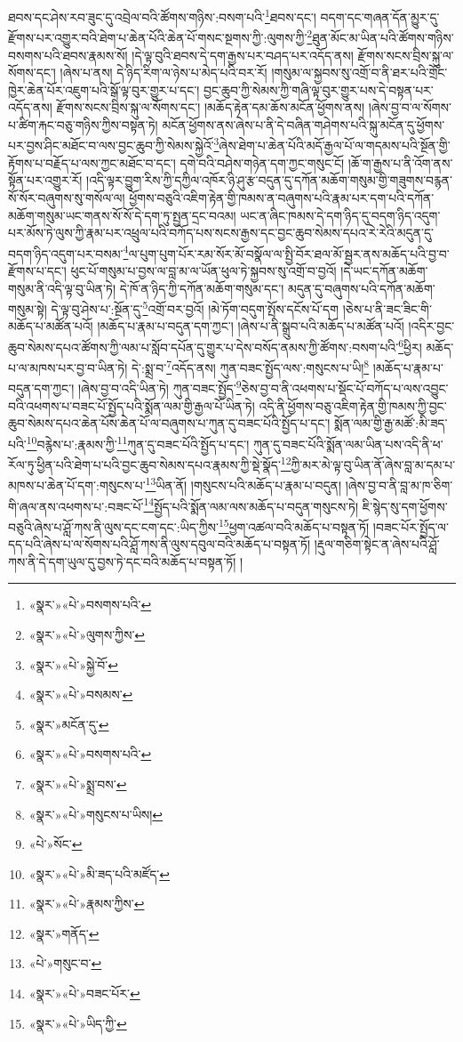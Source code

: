 ཐབས་དང་ཤེས་རབ་ཟུང་དུ་འབྲེལ་བའི་ཚོགས་གཉིས་:བསག་པའི་\footnote{«སྣར་»«པེ་»བསགས་པའི་}ཐབས་དང་། བདག་དང་གཞན་དོན་མྱུར་དུ་རྫོགས་པར་འགྱུར་བའི་ཐེག་པ་ཆེན་པོའི་ཆེན་པོ་གསང་སྔགས་ཀྱི་:ལུགས་ཀྱི་\footnote{«སྣར་»«པེ་»ལུགས་ཀྱིས་}ཐུན་མོང་མ་ཡིན་པའི་ཚོགས་གཉིས་བསགས་པའི་ཐབས་རྣམས་སོ། །དེ་ལྟ་བུའི་ཐབས་དེ་དག་རྒྱས་པར་བཤད་པར་འདོད་ནས། རྫོགས་སངས་བྲིས་སྐུ་ལ་སོགས་དང་། །ཞེས་པ་ནས། དེ་ཉིད་རིག་ལ་ཉེས་པ་མེད་པའི་བར་རོ། །གསུམ་ལ་སྐྱབས་སུ་འགྲོ་བ་ནི་ཐར་པའི་གྲོང་ཁྱེར་ཆེན་པོར་འཇུག་པའི་སྒོ་ལྟ་བུར་གྱུར་པ་དང་། བྱང་ཆུབ་ཀྱི་སེམས་ཀྱི་གཞི་ལྟ་བུར་གྱུར་པས་དེ་བསྟན་པར་འདོད་ནས། རྫོགས་སངས་བྲིས་སྐུ་ལ་སོགས་དང་། །མཆོད་རྟེན་དམ་ཆོས་མངོན་ཕྱོགས་ནས། །ཞེས་བྱ་བ་ལ་སོགས་པ་ཚིག་རྐང་བཅུ་གཉིས་ཀྱིས་བསྟན་ཏེ། མངོན་ཕྱོགས་ནས་ཞེས་པ་ནི་དེ་བཞིན་གཤེགས་པའི་སྐུ་མངོན་དུ་ཕྱོགས་པར་བྱས་ཤིང་མཐོང་བ་ལས་བྱང་ཆུབ་ཀྱི་སེམས་སྐྱེའོ་\footnote{«སྣར་»«པེ་»སྐྱེ་བོ་}ཞེས་ཐེག་པ་ཆེན་པོའི་མདོ་རྒྱལ་པོ་ལ་གདམས་པའི་སྔོན་གྱི་རྟོགས་པ་བརྗོད་པ་ལས་ཀྱང་མཐོང་བ་དང་། དགེ་བའི་བཤེས་གཉེན་དག་ཀྱང་གསུང་ངོ། །ཆོ་ག་རྒྱས་པ་ནི་འོག་ནས་སྟོན་པར་འགྱུར་རོ། །འདི་ལྟར་བྱུག་རིས་ཀྱི་དཀྱིལ་འཁོར་ཉི་ཤུ་རྩ་བདུན་དུ་དཀོན་མཆོག་གསུམ་གྱི་གཟུགས་བརྙན་སོ་སོར་བཞུགས་སུ་གསོལ་ལ། ཕྱོགས་བཅུའི་འཇིག་རྟེན་གྱི་ཁམས་ན་བཞུགས་པའི་རྣམ་པར་དག་པའི་དཀོན་མཆོག་གསུམ་ཡང་གནས་སོ་སོ་དེ་དག་ཏུ་སྤྱན་དྲང་བའམ། ཡང་ན་ཞིང་ཁམས་དེ་དག་ཉིད་དུ་བདག་ཉིད་འདུག་པར་མོས་ཏེ་ལུས་ཀྱི་རྣམ་པར་འཕྲུལ་པའི་བཀོད་པས་སངས་རྒྱས་དང་བྱང་ཆུབ་སེམས་དཔའ་རེ་རེའི་མདུན་དུ་བདག་ཉིད་འདུག་པར་བསམ་\footnote{«སྣར་»«པེ་»བསམས་}ལ་པུག་པུག་པོར་རམ་སོར་མོ་བསྣོལ་ལ་སྤྱི་བོར་ཐལ་མོ་སྦྱར་ནས་མཆོད་པའི་བྱ་བ་རྫོགས་པ་དང་། ཕུང་པོ་གསུམ་པ་བྱས་ལ་བླ་མ་ལ་ཡོན་ཕུལ་ཏེ་སྐྱབས་སུ་འགྲོ་བ་བྱའོ། །དེ་ཡང་དཀོན་མཆོག་གསུམ་ནི་འདི་ལྟ་བུ་ཡིན་ཏེ། དེ་ཁོ་ན་ཉིད་ཀྱི་དཀོན་མཆོག་གསུམ་དང་། མདུན་དུ་བཞུགས་པའི་དཀོན་མཆོག་གསུམ་སྟེ། དེ་ལྟ་བུ་ཤེས་པ་:སྔོན་དུ་\footnote{«སྣར་»མངོན་དུ་}འགྲོ་བར་བྱའོ། །མེ་ཏོག་བདུག་སྤོས་དངོས་པོ་དག །ཅེས་པ་ནི་ཟང་ཟིང་གི་མཆོད་པ་མཚོན་པའོ། །མཆོད་པ་རྣམ་པ་བདུན་དག་ཀྱང་། །ཞེས་པ་ནི་སྒྲུབ་པའི་མཆོད་པ་མཚོན་པའོ། །འདིར་བྱང་ཆུབ་སེམས་དཔའ་ཚོགས་ཀྱི་ལམ་པ་སློབ་དཔོན་དུ་གྱུར་པ་དེས་བསོད་ནམས་ཀྱི་ཚོགས་:བསག་པའི་\footnote{«སྣར་»«པེ་»བསགས་པའི་}ཕྱིར། མཆོད་པ་ལ་མཁས་པར་བྱ་བ་ཡིན་ཏེ། དེ་:སྨྲ་བ་\footnote{«སྣར་»«པེ་»སྨྲ་བས་}འདོད་ནས། ཀུན་བཟང་སྤྱོད་ལས་:གསུངས་པ་ཡི།\footnote{«སྣར་»«པེ་»གསུངས་པ་ཡིས།} །མཆོད་པ་རྣམ་པ་བདུན་དག་ཀྱང་། །ཞེས་བྱ་བ་འདི་ཡིན་ཏེ། ཀུན་བཟང་སྤྱོད་\footnote{«པེ་»སོང་}ཅེས་བྱ་བ་ནི་འཕགས་པ་སྡོང་པོ་བཀོད་པ་ལས་འབྱུང་བའི་འཕགས་པ་བཟང་པོ་སྤྱོད་པའི་སྨོན་ལམ་གྱི་རྒྱལ་པོ་ཡིན་ཏེ། འདི་ནི་ཕྱོགས་བཅུ་འཇིག་རྟེན་གྱི་ཁམས་ཀྱི་བྱང་ཆུབ་སེམས་དཔའ་ཆེན་པོས་ཆེན་པོ་ལ་བཞུགས་པ་ཀུན་དུ་བཟང་པོའི་སྤྱོད་པ་དང་། སྨོན་ལམ་གྱི་རྒྱ་མཚོ་:མི་ཟད་པའི་\footnote{«སྣར་»«པེ་»མི་ཟད་པའི་མཛོད་}བརྙེས་པ་:རྣམས་ཀྱི་\footnote{«སྣར་»«པེ་»རྣམས་ཀྱིས་}ཀུན་དུ་བཟང་པོའི་སྤྱོད་པ་དང་། ཀུན་དུ་བཟང་པོའི་སྨོན་ལམ་ཡིན་པས་འདི་ནི་ཕ་རོལ་ཏུ་ཕྱིན་པའི་ཐེག་པ་པའི་བྱང་ཆུབ་སེམས་དཔའ་རྣམས་ཀྱི་སྡེ་སྣོད་\footnote{«སྣར་»གནོད་}ཀྱི་མར་མེ་ལྟ་བུ་ཡིན་ནོ་ཞེས་བླ་མ་དམ་པ་མཁས་པ་ཆེན་པོ་དག་:གསུངས་པ་\footnote{«པེ་»གསུང་བ་}ཡིན་ནོ། །གསུངས་པའི་མཆོད་པ་རྣམ་པ་བདུན། །ཞེས་བྱ་བ་ནི་བླ་མ་ཁ་ཅིག་གི་ཞལ་ནས་འཕགས་པ་:བཟང་པོ་\footnote{«སྣར་»«པེ་»བཟང་པོར་}སྤྱོད་པའི་སྨོན་ལམ་ལས་མཆོད་པ་བདུན་གསུངས་ཏེ། ཇི་སྙེད་སུ་དག་ཕྱོགས་བཅུའི་ཞེས་པ་ཤློ་ཀས་ནི་ལུས་དང་ངག་དང་:ཡིད་ཀྱིས་\footnote{«སྣར་»«པེ་»ཡིད་ཀྱི་}ཕྱག་འཚལ་བའི་མཆོད་པ་བསྟན་ཏོ། །བཟང་པོར་སྤྱོད་ལ་དད་པའི་ཞེས་པ་ལ་སོགས་པའི་ཤློ་ཀས་ནི་ལུས་དབུལ་བའི་མཆོད་པ་བསྟན་ཏོ། །རྡུལ་གཅིག་སྟེང་ན་ཞེས་པའི་ཤློ་ཀས་ནི་དེ་དག་ཡུལ་དུ་བྱས་ཏེ་དང་བའི་མཆོད་པ་བསྟན་ཏོ། །
